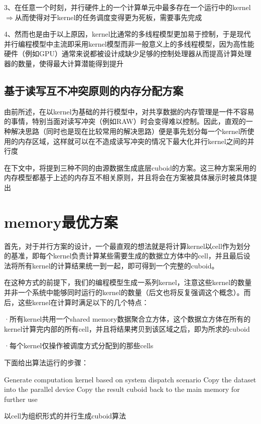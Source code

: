 3、在任意一个时刻，并行硬件上的一个计算单元中最多存在一个运行中的kernel{\quad$\Rightarrow$\quad}从而使得对于kernel的任务调度变得更为死板，需要事先完成

4、然而也是由于以上原因，kernel比通常的多线程模型更加易于控制，于是现代并行编程模型中主流即采用kernel模型而非一般意义上的多线程模型，因为高性能硬件（例如GPU）通常来说都被设计成缺少足够的控制处理器从而提高计算处理器的数量，使得最大计算潜能得到提升


\subsection{基于读写互不冲突原则的内存分配方案}
由前所述，在以kernel为基础的并行模型中，对共享数据的内存管理是一件不容易的事情，特别当面对读写冲突（例如RAW）时会变得难以控制。因此，直观的一种解决思路（同时也是现在比较常用的解决思路）便是事先划分每一个kernel所使用的内存区域，这样就可以在不造成读写冲突的情况下最大化并行kernel之间的并行度

在下文中，将提到三种不同的由源数据生成底层cuboid的方案。这三种方案采用的内存模型都基于上述的内存互不相关原则，并且将会在方案被具体展示时被具体提出

\section{memory最优方案}
首先，对于并行方案的设计，一个最直观的想法就是将计算kernel以cell作为划分的基准，即每个kernel负责计算某些需要生成的数据立方体中的cell，并且最后设法将所有kernel的计算结果统一到一起，即可得到一个完整的cuboid。

在这种方式的前提下，我们的编程模型生成一系列kernel，注意这些kernel的数量并非一个系统中能够同时运行的kernel的数量（后文也将反复强调这个概念）。而后，这些kernel在计算时满足以下的几个特点：

{\quad}·所有kernel共用一个shared memory数据聚合立方体，这个数据立方体在所有的kernel计算完内部的所有cell，并且将结果拷贝到该区域之后，即为所求的cuboid

{\quad}·每个kernel仅操作被调度方式分配到的那些cells

下面给出算法运行的步骤：

\begin{algorithm}[htbp]
\SetAlgoLined
{}
Generate computation kernel based on system dispatch scenario\;
Copy the dataset into the parallel device\;
Copy the result cuboid back to the main memory for further use\;
\caption{以cell为组织形式的并行生成cuboid算法}
\label{algo:algorithm1}
\end{algorithm}

